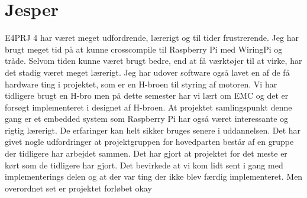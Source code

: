 \section{Jesper} 

E4PRJ 4 har været meget udfordrende, lærerigt og til tider frustrerende. Jeg har brugt meget tid på at kunne crosscompile til Raspberry Pi med WiringPi og tråde. Selvom tiden kunne været brugt bedre, end at få værktøjer til at virke, har det stadig været meget lærerigt. Jeg har udover software også lavet en af de få hardware ting i projektet, som er en H-broen til styring af motoren. Vi har tidligere brugt en H-bro men på dette semester har vi lært om EMC og det er forsøgt implementeret i designet af H-broen.
At projektet samlingspunkt denne gang er et embedded system som Raspberry Pi har også været interessante og rigtig lærerigt. De erfaringer kan helt sikker bruges senere i uddannelsen. \newline
Det har givet nogle udfordringer at projektgruppen for hovedparten består af en gruppe der tidligere har arbejdet sammen. Det har gjort at projektet for det meste er kørt som de tidligere har gjort. Det bevirkede at vi kom lidt sent i gang med implementerings delen og at der var ting der ikke blev færdig implementeret. Men overordnet set er projektet forløbet okay
